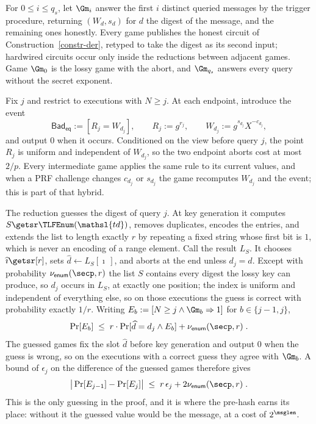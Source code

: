 For $0 \le i \le q_s$, let $\Gm_i$ answer the first $i$ distinct queried messages by the trigger procedure, returning $(W_{d}, s_{d})$ for $d$ the digest of the message, and the remaining ones honestly. Every game publishes the honest circuit of Construction~\ref{constr-der}, retyped to take the digest as its second input; hardwired circuits occur only inside the reductions between adjacent games. Game $\Gm_0$ is the lossy game with the abort, and $\Gm_{q_s}$ answers every query without the secret exponent.

 Fix $j$ and restrict to executions with $N \ge j$. At each endpoint, introduce the event
$$
\mathsf{Bad}_{\mathsf{eq}} := [R_j = W_{d_j}],
\qquad
R_j := g^{r_j},
\qquad
W_{d_j} := g^{s_{d_j}}X^{-c_{d_j}},
$$
and output 0 when it occurs. Conditioned on the view before query $j$, the point $R_j$ is uniform and independent of $W_{d_j}$, so the two endpoint aborts cost at most $2/p$. Every intermediate game applies the same rule to its current values, and when a PRF challenge changes $c_{d_j}$ or $s_{d_j}$ the game recomputes $W_{d_j}$ and the event; this is part of that hybrid.

 The reduction guesses the digest of query $j$. At key generation it computes $S \getsr \TLFEnum(\mathsl{td})$, removes duplicates, encodes the entries, and extends the list to length exactly $r$ by repeating a fixed string whose first bit is $1$, which is never an encoding of a range element. Call the result $L_S$. It chooses $\widehat\imath \getsr [r]$, sets $\widehat d \gets L_S[\widehat\imath\,]$, and aborts at the end unless $d_j = \widehat d$. Except with probability $\nu_{\mathsf{enum}}(\secp,r)$ the list $S$ contains every digest the lossy key can produce, so $d_j$ occurs in $L_S$, at exactly one position; the index is uniform and independent of everything else, so on those executions the guess is correct with probability exactly $1/r$. Writing $E_b := [N \ge j \land \Gm_b \Rightarrow 1]$ for $b \in \{j-1,j\}$,
$$
\Pr[E_b] \;\le\; r \cdot \Pr[\widehat d = d_j \land E_b] + \nu_{\mathsf{enum}}(\secp,r) \;.
$$
The guessed games fix the slot $\widehat d$ before key generation and output 0 when the guess is wrong, so on the executions with a correct guess they agree with $\Gm_b$. A bound of $\epsilon_j$ on the difference of the guessed games therefore gives
$$
\big|\Pr[E_{j-1}] - \Pr[E_j]\big| \;\le\; r\,\epsilon_j + 2\nu_{\mathsf{enum}}(\secp,r) \;.
$$
This is the only guessing in the proof, and it is where the pre-hash earns its place: without it the guessed value would be the message, at a cost of $2^{\msglen}$.

